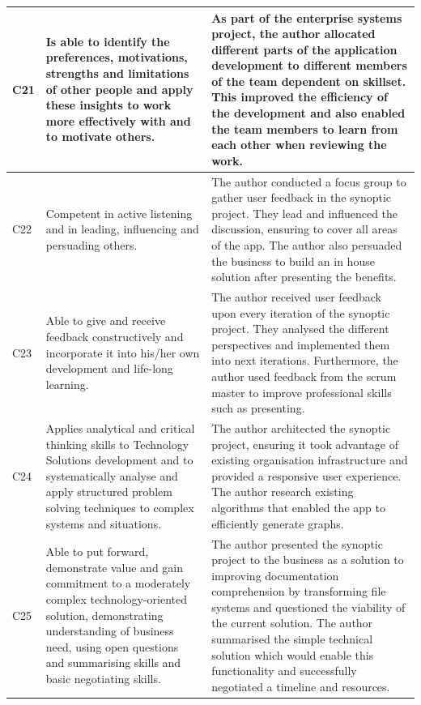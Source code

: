 \documentclass{article}
\begin{document}
\begin{landscape}
\begin{longtable}{|l|p{10cm}|p{10cm}|}
C21 &
  Is able to identify the   preferences, motivations, strengths and limitations of other people and apply   these insights to work more effectively with and to motivate others. &
  As part of the enterprise   systems project, the author allocated different parts of the application   development to different members of the team dependent on skillset. This   improved the efficiency of the development and also enabled the team members   to learn from each other when reviewing the work. \\ \hline
C22 &
  Competent in active listening   and in leading, influencing and persuading others. &
  The author conducted a focus   group to gather user feedback in the synoptic project. They lead and   influenced the discussion, ensuring to cover all areas of the app. The author   also persuaded the business to build an in house solution after presenting   the benefits. \\ \hline
C23 &
  Able to give and receive   feedback constructively and incorporate it into his/her own development and   life-long learning. &
  The author received user   feedback upon every iteration of the synoptic project. They analysed the   different perspectives and implemented them into next iterations.   Furthermore, the author used feedback from the scrum master to improve   professional skills such as presenting. \\ \hline
C24 &
  Applies analytical and   critical thinking skills to Technology Solutions development and to   systematically analyse and apply structured problem solving techniques to   complex systems and situations. &
  The author architected the   synoptic project, ensuring it took advantage of existing organisation   infrastructure and provided a responsive user experience. The author research   existing algorithms that enabled the app to efficiently generate graphs. \\ \hline
C25 &
  Able to put forward,   demonstrate value and gain commitment to a moderately complex   technology-oriented solution, demonstrating understanding of business need,   using open questions and summarising skills and basic negotiating skills. &
  The author presented the   synoptic project to the business as a solution to improving documentation   comprehension by transforming file systems and questioned the viability of   the current solution. The author summarised the simple technical solution   which would enable this functionality and successfully negotiated a timeline   and resources. \\ \hline

\end{longtable}
\end{landscape}
\end{document}
